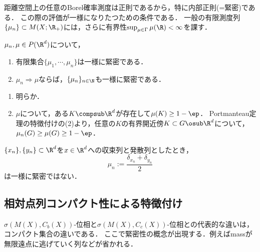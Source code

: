\documentclass[uplatex,dvipdfmx]{jsreport}
\begin{document}
\begin{remark}
    距離空間上の任意のBorel確率測度は正則であるから，特に内部正則(=緊密)である．
    この際の評価が一様になりたつための条件である．
    一般の有限測度列$\{\mu_n\}\subset M(X;\R_+)$には，さらに有界性$\sup_{\mu\in\Gamma}\mu(\R)<\infty$を課す．
\end{remark}

\begin{lemma}
    $\mu_n,\mu\in P(\R^d)$について，
    \begin{enumerate}
        \item 有限集合$\{\mu_1,\cdots,\mu_n\}$は一様に緊密である．
        \item $\mu_n\Rightarrow\mu$ならば，$\{\mu_n\}_{n\in\N}$も一様に緊密である．
    \end{enumerate}
\end{lemma}
\begin{Proof}\mbox{}
    \begin{enumerate}
        \item 明らか．
        \item $\mu$について，ある$K\compsub\R^d$が存在して$\mu(K)\ge1-\ep$．
        Portmanteau定理の特徴付けの(2)より，任意の$K$の有界開近傍$K\subset G\osub\R^d$について，$\mu_n(G)\ge\mu(G)\ge1-\ep$．
    \end{enumerate}
\end{Proof}

\begin{example}[一様に緊密でない例]
    $\{x_n\},\{y_n\}\subset\R^d$を$x\in\R^d$への収束列と発散列としたとき，
    \[\mu_n:=\frac{\delta_{x_n}+\delta_{y_n}}{2}\]
    は一様に緊密ではない．
\end{example}

\subsection{相対点列コンパクト性による特徴付け}

\begin{tcolorbox}[colframe=ForestGreen, colback=ForestGreen!10!white,breakable,colbacktitle=ForestGreen!40!white,coltitle=black,fonttitle=\bfseries\sffamily,
    title=]
    $\sigma(M(X),C_b(X))$-位相と$\sigma(M(X),C_c(X))$-位相との代表的な違いは，コンパクト集合の違いである．
    ここで緊密性の概念が出現する．例えばmassが無限遠点に逃げていく列などが省かれる．
\end{tcolorbox}
\end{document}
